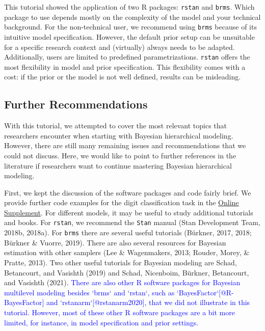 \documentclass[
  english,
  doc,floatsintext]{apa6}
\begin{document}
This tutorial showed the application of two R packages: \texttt{rstan} and \texttt{brms}. Which package to use depends mostly on the complexity of the model and your technical background. For the non-technical user, we recommend using \texttt{brms} because of its intuitive model specification. However, the default prior setup can be unsuitable for a specific research context and (virtually) always needs to be adapted. Additionally, users are limited to predefined parametrizations. \texttt{rstan} offers the most flexibility in model and prior specification. This flexibility comes with a cost: if the prior or the model is not well defined, results can be misleading.

\hypertarget{further-recommendations}{%
\subsection{Further Recommendations}\label{further-recommendations}}

With this tutorial, we attempted to cover the most relevant topics that researchers encounter when starting with Bayesian hierarchical modeling. However, there are still many remaining issues and recommendations that we could not discuss. Here, we would like to point to further references in the literature if researchers want to continue mastering Bayesian hierarchical modeling.

First, we kept the discussion of the software packages and code fairly brief. We provide further code examples for the digit classification task in the \href{https://github.com/MyrtheV/Bayesian-Hierarchical-Modelling-An-Introduction-and-Reassessment}{Online Supplement}. For different models, it may be useful to study additional tutorials and books. For \texttt{rstan}, we recommend the \texttt{Stan} manual (Stan Development Team, 2018b, 2018a). For \texttt{brms} there are several useful tutorials (Bürkner, 2017, 2018; Bürkner \& Vuorre, 2019). There are also several resources for Bayesian estimation with other samplers (Lee \& Wagenmakers, 2013; Rouder, Morey, \& Pratte, 2013). Two other useful tutorials for Bayesian modeling are Schad, Betancourt, and
Vasishth (2019) and Schad, Nicenboim, Bürkner, Betancourt, and Vasishth (2021). \textcolor{blue}{There are also other R software packages for Bayesian multilevel modeling besides `brms` and `rstan`, such as `BayesFactor`[@R-BayesFactor] and `rstanarm`[@rstanarm2020], that we did not illustrate in this tutorial. However, most of these other R software packages are a bit more limited, for instance, in model specification and prior settings.}
\end{document}
